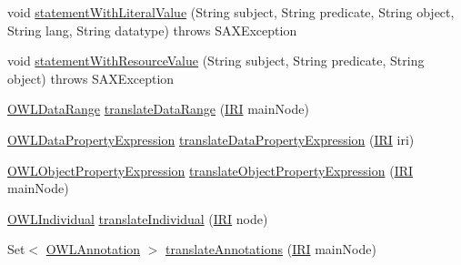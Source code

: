 \begin{DoxyCompactItemize}
\item 
void \hyperlink{classorg_1_1coode_1_1owlapi_1_1rdfxml_1_1parser_1_1_o_w_l_r_d_f_consumer_a59af5a8dde2882f813b3ce6b699ccc17}{statement\-With\-Literal\-Value} (String subject, String predicate, String object, String lang, String datatype)  throws S\-A\-X\-Exception 
\item 
void \hyperlink{classorg_1_1coode_1_1owlapi_1_1rdfxml_1_1parser_1_1_o_w_l_r_d_f_consumer_a15c4e81924bc4ca236d28f49ed9fd322}{statement\-With\-Resource\-Value} (String subject, String predicate, String object)  throws S\-A\-X\-Exception 
\item 
\hyperlink{interfaceorg_1_1semanticweb_1_1owlapi_1_1model_1_1_o_w_l_data_range}{O\-W\-L\-Data\-Range} \hyperlink{classorg_1_1coode_1_1owlapi_1_1rdfxml_1_1parser_1_1_o_w_l_r_d_f_consumer_a4604677ebb171163dfa14d7c2d9d70d8}{translate\-Data\-Range} (\hyperlink{classorg_1_1semanticweb_1_1owlapi_1_1model_1_1_i_r_i}{I\-R\-I} main\-Node)
\item 
\hyperlink{interfaceorg_1_1semanticweb_1_1owlapi_1_1model_1_1_o_w_l_data_property_expression}{O\-W\-L\-Data\-Property\-Expression} \hyperlink{classorg_1_1coode_1_1owlapi_1_1rdfxml_1_1parser_1_1_o_w_l_r_d_f_consumer_a872b84982bf045d46b5ffdfbdeb5c404}{translate\-Data\-Property\-Expression} (\hyperlink{classorg_1_1semanticweb_1_1owlapi_1_1model_1_1_i_r_i}{I\-R\-I} iri)
\item 
\hyperlink{interfaceorg_1_1semanticweb_1_1owlapi_1_1model_1_1_o_w_l_object_property_expression}{O\-W\-L\-Object\-Property\-Expression} \hyperlink{classorg_1_1coode_1_1owlapi_1_1rdfxml_1_1parser_1_1_o_w_l_r_d_f_consumer_ab6bbe4d3e11d35fb2355d1f2e5f29e94}{translate\-Object\-Property\-Expression} (\hyperlink{classorg_1_1semanticweb_1_1owlapi_1_1model_1_1_i_r_i}{I\-R\-I} main\-Node)
\item 
\hyperlink{interfaceorg_1_1semanticweb_1_1owlapi_1_1model_1_1_o_w_l_individual}{O\-W\-L\-Individual} \hyperlink{classorg_1_1coode_1_1owlapi_1_1rdfxml_1_1parser_1_1_o_w_l_r_d_f_consumer_abce7f6cb06aa3daad2f8791d0f289369}{translate\-Individual} (\hyperlink{classorg_1_1semanticweb_1_1owlapi_1_1model_1_1_i_r_i}{I\-R\-I} node)
\item 
Set$<$ \hyperlink{interfaceorg_1_1semanticweb_1_1owlapi_1_1model_1_1_o_w_l_annotation}{O\-W\-L\-Annotation} $>$ \hyperlink{classorg_1_1coode_1_1owlapi_1_1rdfxml_1_1parser_1_1_o_w_l_r_d_f_consumer_ad98484b2bed09e1c07862961afc69ed8}{translate\-Annotations} (\hyperlink{classorg_1_1semanticweb_1_1owlapi_1_1model_1_1_i_r_i}{I\-R\-I} main\-Node)
\item 

\end{DoxyCompactItemize}
